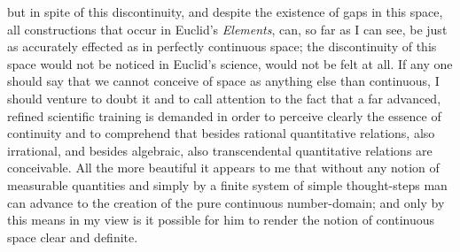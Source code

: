 \documentclass[oneside]{book}
\begin{document}
but in spite of this discontinuity, and despite
the existence of gaps in this space, all constructions
that occur in Euclid's \textit{Elements}, can, so far as I
can see, be just as accurately effected as in perfectly
continuous space; the discontinuity of this space
would not be noticed in Euclid's science, would not
be felt at all. If any one should say that we cannot
conceive of space as anything else than continuous, I
should venture to doubt it and to call attention to the
fact that a far advanced, refined scientific training is
demanded in order to perceive clearly the essence of
continuity and to comprehend that besides rational
quantitative relations, also irrational, and besides algebraic,
also transcendental quantitative relations are
conceivable. All the more beautiful it appears to me
that without any notion of measurable quantities and
simply by a finite system of simple thought-steps man
can advance to the creation of the pure continuous
number-domain; and only by this means in my view
is it possible for him to render the notion of continuous
space clear and definite.
\end{document}
